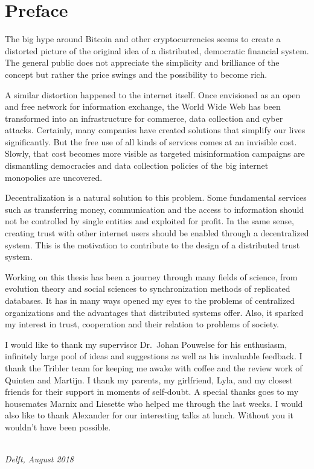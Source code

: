 \chapter*{Preface}

The big hype around Bitcoin and other cryptocurrencies seems to create a distorted picture of the 
original idea of a distributed, democratic financial system. The general public does not appreciate
the simplicity and brilliance of the concept but rather the price swings and the
possibility to become rich. 

A similar distortion happened to the internet itself. Once envisioned as an 
open and free network for information exchange, the World Wide Web has been transformed into an
infrastructure for commerce, data collection and cyber attacks. Certainly, many companies have created 
solutions that simplify our lives significantly. But the free use of all kinds of services comes at 
an invisible cost. Slowly, that cost becomes more visible as targeted misinformation campaigns are
dismantling democracies and data collection policies of the big internet monopolies are uncovered.

Decentralization is a natural solution to this problem. Some fundamental services such as transferring
money, communication and the access to information should not be controlled by single entities and 
exploited for profit. In the same sense, creating trust with other internet users should be 
enabled through a decentralized system. This is the motivation to contribute to the design of a
distributed trust system.

Working on this thesis has been a journey through many fields of science, from evolution theory and 
social sciences to synchronization methods of replicated databases. 
It has in many ways opened my eyes to the problems of centralized 
organizations and the advantages that distributed systems offer. Also, it sparked my interest in 
trust, cooperation and their relation to problems of society.

I would like to thank my supervisor Dr.\ Johan Pouwelse for his enthusiasm, infinitely large pool of
ideas and suggestions as well as his invaluable feedback. I thank the Tribler team for keeping me 
awake with coffee and the review work of Quinten and Martijn. I thank my parents, my girlfriend, Lyla, 
and my closest friends for their support in moments of self-doubt. A special thanks goes to my 
housemates Marnix and Liesette who helped me through the last weeks. I would also like to thank 
Alexander for our interesting talks at lunch. Without you it wouldn't have been possible.


\begin{flushright}
{\makeatletter\itshape
    \@author \\
    Delft, August 2018
\makeatother}
\end{flushright}

